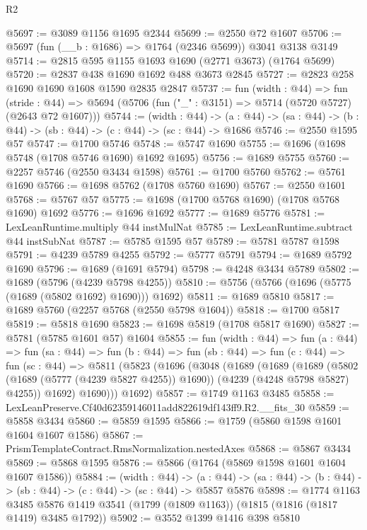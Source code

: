 \begin{lexlean}{R2}
\begin{coremodule}
@5697 := @3089 @1156 @1695 @2344
@5699 := @2550 @72 @1607
@5706 := @5697 (fun (__b : @1686) => @1764 (@2346 @5699)) @3041 @3138 @3149
@5714 := @2815 @595 @1155 @1693 @1690 (@2771 @3673) (@1764 @5699)
@5720 := @2837 @438 @1690 @1692 @488 @3673 @2845
@5727 := @2823 @258 @1690 @1690 @1608 @1590 @2835 @2847
@5737 := fun (width : @44) =>
  fun (stride : @44) => @5694 (@5706 (fun ("_" : @3151) => @5714 (@5720 @5727) (@2643 @72 @1607)))
@5744 := (width : @44) ->
  (a : @44) -> (sa : @44) -> (b : @44) -> (sb : @44) -> (c : @44) -> (sc : @44) -> @1686
@5746 := @2550 @1595 @57
@5747 := @1700 @5746
@5748 := @5747 @1690
@5755 := @1696 (@1698 @5748 (@1708 @5746 @1690) @1692 @1695)
@5756 := @1689 @5755
@5760 := @2257 @5746 (@2550 @3434 @1598)
@5761 := @1700 @5760
@5762 := @5761 @1690
@5766 := @1698 @5762 (@1708 @5760 @1690)
@5767 := @2550 @1601
@5768 := @5767 @57
@5775 := @1698 (@1700 @5768 @1690) (@1708 @5768 @1690) @1692
@5776 := @1696 @1692
@5777 := @1689 @5776
@5781 := LexLeanRuntime.multiply @44 instMulNat
@5785 := LexLeanRuntime.subtract @44 instSubNat
@5787 := @5785 @1595 @57
@5789 := @5781 @5787 @1598
@5791 := @4239 @5789 @4255
@5792 := @5777 @5791
@5794 := @1689 @5792 @1690
@5796 := @1689 (@1691 @5794)
@5798 := @4248 @3434 @5789
@5802 := @1689 (@5796 (@4239 @5798 @4255))
@5810 := @5756 (@5766 (@1696 (@5775 (@1689 (@5802 @1692) @1690))) @1692)
@5811 := @1689 @5810
@5817 := @1689 @5760 (@2257 @5768 (@2550 @5798 @1604))
@5818 := @1700 @5817
@5819 := @5818 @1690
@5823 := @1698 @5819 (@1708 @5817 @1690)
@5827 := @5781 (@5785 @1601 @57) @1604
@5855 := fun (width : @44) =>
  fun (a : @44) =>
  fun (sa : @44) =>
  fun (b : @44) =>
  fun (sb : @44) =>
  fun (c : @44) =>
  fun (sc : @44) =>
  @5811
    (@5823
      (@1696
        (@3048
          (@1689
            (@1689
              (@1689
                (@5802 (@1689 (@5777 (@4239 @5827 @4255)) @1690))
                (@4239 (@4248 @5798 @5827) @4255))
              @1692)
            @1690)))
      @1692)
@5857 := @1749 @1163 @3485
@5858 := LexLeanPreserve.Cf40d62359146011add822619df143ff9.R2.__fits_30
@5859 := @5858 @3434
@5860 := @5859 @1595
@5866 := @1759 (@5860 @1598 @1601 @1604 @1607 @1586)
@5867 := PrismTemplateContract.RmsNormalization.nestedAxes
@5868 := @5867 @3434
@5869 := @5868 @1595
@5876 := @5866 (@1764 (@5869 @1598 @1601 @1604 @1607 @1586))
@5884 := (width : @44) ->
  (a : @44) -> (sa : @44) -> (b : @44) -> (sb : @44) -> (c : @44) -> (sc : @44) -> @5857 @5876
@5898 := @1774
    @1163
    @3485
    @5876
    @1419
    @3541
    (@1799 (@1809 @1163))
    (@1815 (@1816 (@1817 @1419) @3485 @1792))
@5902 := @3552 @1399 @1416 @398 @5810

\end{coremodule}
\end{lexlean}
